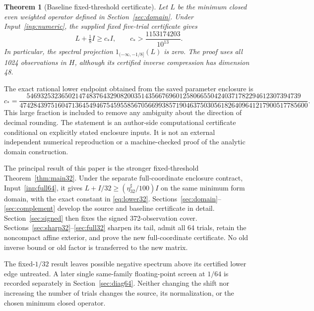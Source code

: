 \documentclass[11pt,a4paper]{article}
\numberwithin{equation}{section}
\newtheorem{theorem}{Theorem}[section]
\theoremstyle{definition}\newtheorem{definition}[theorem]{Definition}
\theoremstyle{remark}\newtheorem{remark}[theorem]{Remark}
\begin{document}
\begin{theorem}[Baseline fixed-threshold certificate]\label{thm:main}
Let $L$ be the minimum closed even weighted operator defined in Section~\ref{sec:domain}. Under Input~\ref{inp:numeric}, the supplied fixed five-trial certificate gives
\begin{equation}\label{eq:main}
 L+\tfrac18I\ge c_*I,
 \qquad c_*>\frac{1153174203}{10^{13}}.
\end{equation}
In particular, the spectral projection $1_{(-\infty,-1/8]}(L)$ is zero. The proof uses all 1024 observations in $H$, although its certified inverse compression has dimension 48.
\end{theorem}

The exact rational lower endpoint obtained from the saved parameter enclosure is
\begingroup\footnotesize
\begin{equation}\label{eq:cstar}
 c_*=
 \frac{5469325323650214748376432908200351435667696012580665504240371782294612307394739}
 {47428439751604713645494675459558567056699385719046375030561826409641217900517785600}.
\end{equation}
\endgroup
This large fraction is included to remove any ambiguity about the direction of decimal rounding. The statement is an author-side computational certificate conditional on explicitly stated enclosure inputs. It is not an external independent numerical reproduction or a machine-checked proof of the analytic domain construction.

The principal result of this paper is the stronger fixed-threshold Theorem~\ref{thm:main32}. Under the separate full-coordinate enclosure contract, Input~\ref{inp:full64}, it gives $L+I/32\ge(\eta_{32}^{\sharp}/100)I$ on the same minimum form domain, with the exact constant in \eqref{eq:lower32}. Sections~\ref{sec:domain}--\ref{sec:complement} develop the source and baseline certificate in detail. Section~\ref{sec:signed} then fixes the signed 372-observation cover. Sections~\ref{sec:sharp32}--\ref{sec:full32} sharpen its tail, admit all 64 trials, retain the noncompact affine exterior, and prove the new full-coordinate certificate. No old inverse bound or old factor is transferred to the new matrix.

The fixed-$1/32$ result leaves possible negative spectrum above its certified lower edge untreated. A later single same-family floating-point screen at $1/64$ is recorded separately in Section~\ref{sec:diag64}. Neither changing the shift nor increasing the number of trials changes the source, its normalization, or the chosen minimum closed operator.
\end{document}

